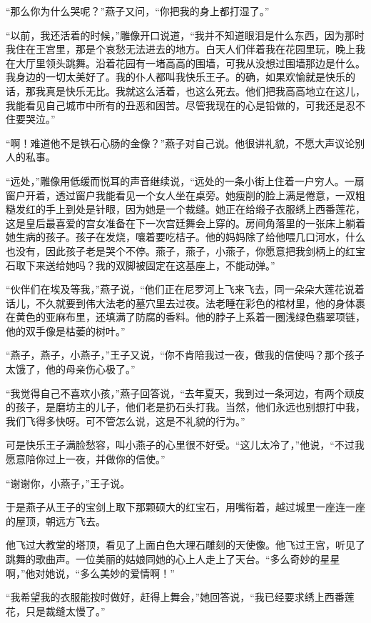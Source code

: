 \documentclass[12pt,UTF-8,openany]{ctexbook}
\begin{document}
\begin{normalsize}
    “那么你为什么哭呢？”燕子又问，“你把我的身上都打湿了。”
    
    “以前，我还活着的时候，”雕像开口说道，“我并不知道眼泪是什么东西，因为那时我住在王宫里，那是个哀愁无法进去的地方。白天人们伴着我在花园里玩，晚上我在大厅里领头跳舞。沿着花园有一堵高高的围墙，可我从没想过围墙那边是什么。我身边的一切太美好了。我的仆人都叫我快乐王子。的确，如果欢愉就是快乐的话，那我真是快乐无比。我就这么活着，也这么死去。他们把我高高地立在这儿，我能看见自己城市中所有的丑恶和困苦。尽管我现在的心是铅做的，可我还是忍不住要哭泣。”
    
    “啊！难道他不是铁石心肠的金像？”燕子对自己说。他很讲礼貌，不愿大声议论别人的私事。
    
    “远处，”雕像用低缓而悦耳的声音继续说，“远处的一条小街上住着一户穷人。一扇窗户开着，透过窗户我能看见一个女人坐在桌旁。她瘦削的脸上满是倦意，一双粗糙发红的手上到处是针眼，因为她是一个裁缝。她正在给缎子衣服绣上西番莲花，这是皇后最喜爱的宫女准备在下一次宫廷舞会上穿的。房间角落里的一张床上躺着她生病的孩子。孩子在发烧，嚷着要吃桔子。他的妈妈除了给他喂几口河水，什么也没有，因此孩子老是哭个不停。燕子，燕子，小燕子，你愿意把我剑柄上的红宝石取下来送给她吗？我的双脚被固定在这基座上，不能动弹。”
    
    “伙伴们在埃及等我，”燕子说，“他们正在尼罗河上飞来飞去，同一朵朵大莲花说着话儿，不久就要到伟大法老的墓穴里去过夜。法老睡在彩色的棺材里，他的身体裹在黄色的亚麻布里，还填满了防腐的香料。他的脖子上系着一圈浅绿色翡翠项链，他的双手像是枯萎的树叶。”
    
    “燕子，燕子，小燕子，”王子又说，“你不肯陪我过一夜，做我的信使吗？那个孩子太饿了，他的母亲伤心极了。”
    
    “我觉得自己不喜欢小孩，”燕子回答说，“去年夏天，我到过一条河边，有两个顽皮的孩子，是磨坊主的儿子，他们老是扔石头打我。当然，他们永远也别想打中我，我们飞得多快呀。可不管怎么说，这是不礼貌的行为。”
    
    可是快乐王子满脸愁容，叫小燕子的心里很不好受。“这儿太冷了，”他说，“不过我愿意陪你过上一夜，并做你的信使。”
    
    “谢谢你，小燕子，”王子说。
    
    于是燕子从王子的宝剑上取下那颗硕大的红宝石，用嘴衔着，越过城里一座连一座的屋顶，朝远方飞去。
    
    他飞过大教堂的塔顶，看见了上面白色大理石雕刻的天使像。他飞过王宫，听见了跳舞的歌曲声。一位美丽的姑娘同她的心上人走上了天台。“多么奇妙的星星啊，”他对她说，“多么美妙的爱情啊！”
    
    “我希望我的衣服能按时做好，赶得上舞会，”她回答说，“我已经要求绣上西番莲花，只是裁缝太慢了。”
    

\end{normalsize}
\end{document}
